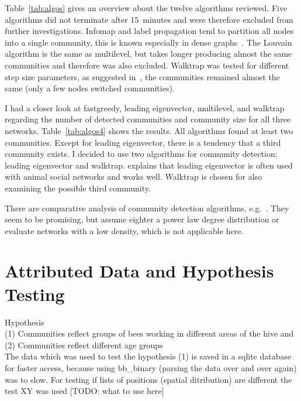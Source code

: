 Table~\ref{tab:algos} gives an overview about the twelve algorithms reviewed. Five algorithms did not terminate after 15~minutes and were therefore excluded from further investigations. Infomap and label propagation tend to partition all nodes into a single community, this is known especially in dense graphs~\cite{yang2016comparative, fortunato2010community}.
The Louvain algorithm is the same as multilevel, but takes longer producing almost the same communities and therefore was also excluded. Walktrap was tested for different step size parameters, as suggested in~\cite{pons2005computing}, the communities remained almost the same (only a few nodes switched communities). 

I had a closer look at fastgreedy, leading eigenvector, multilevel, and walktrap regarding the number of detected communities and community size for all three networks. Table~\ref{tab:algos4} shows the results. All algorithms found at least two communities. Except for leading eigenvector, there is a tendency that a third community exists.
I decided to use two algorithms for community detection: leading eigenvector and walktrap. \textcite{farine2015constructing} explains that leading eigenvector is often used with animal social networks and works well. Walktrap is chosen for also  examining the possible third community.

There are comparative analysis of community detection algorithms, e.g.~\cite{yang2016comparative, harenberg2014community}. They seem to be promising, but assume eighter a power law degree distribution or evaluate networks with a low density, which is not applicable here.




\section{Attributed Data and Hypothesis Testing}
Hypothesis\\
(1) Communities reflect groups of bees working in different areas of the hive and\\
(2) Communities reflect different age groups\\

The data which was used to test the hypothesis (1) is saved in a sqlite database for faster access, because using bb\_binary (parsing the data over and over again) was to slow. For testing if lists of positions (spatial ditribution) are different the test XY was used [TODO: what to use here]

